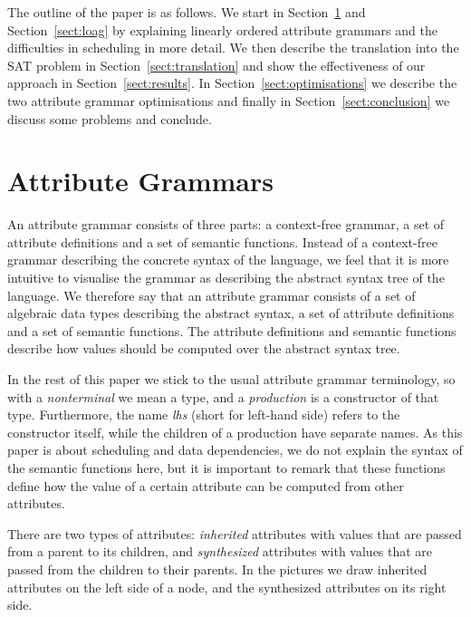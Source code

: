 \documentclass{llncs}
\newcommand{\sectref}[1]{Section~\ref{#1}}
\begin{document}
The outline of the paper is as follows. We start in \sectref{sect:ag} and \sectref{sect:loag} by explaining linearly ordered attribute grammars and the difficulties in scheduling in more detail. We then describe the translation into the SAT problem in \sectref{sect:translation} and show the effectiveness of our approach in \sectref{sect:results}. In \sectref{sect:optimisations} we describe the two attribute grammar optimisations and finally in \sectref{sect:conclusion} we discuss some problems and conclude.


\section{Attribute Grammars} \label{sect:ag}
An attribute grammar consists of three parts: a context-free grammar, a set of attribute definitions and a set of semantic functions. Instead of a context-free grammar describing the concrete syntax of the language, we feel that it is more intuitive to visualise the grammar as describing the abstract syntax tree of the language. We therefore say that an attribute grammar consists of a set of algebraic data types describing the abstract syntax, a set of attribute definitions and a set of semantic functions. The attribute definitions and semantic functions describe how values should be computed over the abstract syntax tree.

In the rest of this paper we stick to the usual attribute grammar terminology, so with a \emph{nonterminal} we mean a type, and a \emph{production} is a constructor of that type. Furthermore, the name \emph{lhs} (short for left-hand side) refers to the constructor itself, while the children of a production have separate names. As this paper is about scheduling and data dependencies, we do not explain the syntax of the semantic functions here, but it is important to remark that these functions define how the value of a certain attribute can be computed from other attributes.

There are two types of attributes: \emph{inherited} attributes with values that are passed from a parent to its children, and \emph{synthesized} attributes with values that are passed from the children to their parents. In the pictures we draw inherited attributes on the left side of a node, and the synthesized attributes on its right side.

\end{document}
